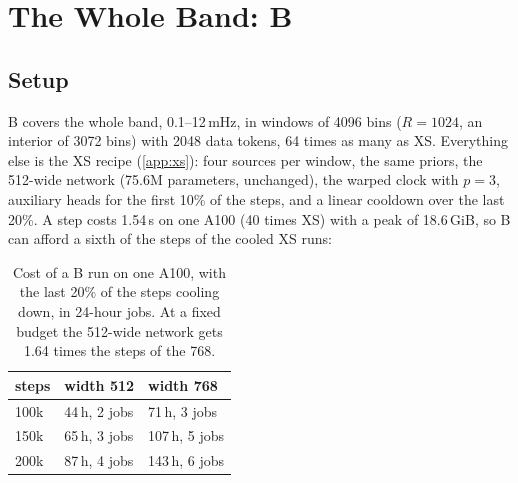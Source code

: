 \section{The Whole Band: B}
\label{app:b}

\subsection{Setup}

B covers the whole band, 0.1--12\,mHz, in windows of 4096 bins ($R=1024$, an interior of 3072
bins) with 2048 data tokens, 64 times as many as XS. Everything else is the XS recipe
(\cref{app:xs}): four sources per window, the same priors, the 512-wide network (75.6M
parameters, unchanged), the warped clock with $p=3$, auxiliary heads for the first 10\% of the
steps, and a linear cooldown over the last 20\%. A step costs 1.54\,s on one A100 (40 times XS) with a peak of 18.6\,GiB, so B can afford a sixth of the steps of the cooled XS runs:

\begin{table}[h]
\caption{Cost of a B run on one A100, with the last 20\% of the steps cooling down, in 24-hour
jobs. At a fixed budget the 512-wide network gets 1.64 times the steps of the 768.}
\label{tab:b-cost}
\centering
\small
\begin{tabular}{lll}
\toprule
steps & width 512 & width 768 \\
\midrule
100k & 44\,h, 2 jobs & 71\,h, 3 jobs \\
150k & 65\,h, 3 jobs & 107\,h, 5 jobs \\
200k & 87\,h, 4 jobs & 143\,h, 6 jobs \\
\bottomrule
\end{tabular}
\end{table}

